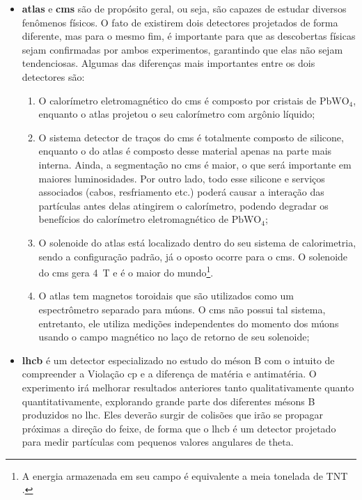 \begin{itemize}
\item \textbf{\gls{atlas}} e \textbf{\gls{cms}} são de propósito geral, ou seja, são capazes de estudar 
diversos fenômenos físicos. O fato de existirem dois detectores projetados de forma
diferente, mas para o mesmo fim, é importante para que as descobertas físicas
sejam confirmadas por ambos experimentos, garantindo que elas não sejam
tendenciosas. Algumas das diferenças mais importantes entre os dois detectores são:
\begin{enumerate}
\item O calorímetro eletromagnético do \gls{cms} é composto por cristais de
$\text{PbWO}_4$, enquanto o
\gls{atlas} projetou o seu calorímetro com argônio líquido;
\item O sistema detector de traços do \gls{cms} é totalmente composto de
silicone, enquanto o do \gls{atlas} é composto desse material apenas na parte mais
interna. Ainda, a segmentação no \gls{cms} é maior, o que será importante em
maiores luminosidades.
Por outro lado, todo esse silicone e serviços associados (cabos, resfriamento
etc.) poderá causar a interação das partículas antes delas atingirem o calorímetro,
podendo degradar os benefícios do calorímetro eletromagnético de $\text{PbWO}_4$;
\item O solenoide do \gls{atlas} está localizado dentro do seu sistema de
calorimetria, sendo a configuração padrão, já o oposto ocorre para o \gls{cms}.
O solenoide do \gls{cms} gera 4~T e é o maior do mundo\footnote{A energia
armazenada em seu campo é equivalente a meia tonelada de TNT \cite{closerLook}.}.
\item O \gls{atlas} tem magnetos toroidais que são utilizados como um
espectrômetro separado para múons. O \gls{cms} não possui tal
sistema, entretanto, ele utiliza medições independentes do momento dos múons
usando o campo magnético no laço de retorno de seu solenoide;
\end{enumerate}
\item \textbf{\gls{lhcb}} é um detector especializado no estudo do méson B com o
intuito de compreender a Violação \gls{cp} e a diferença de matéria e
antimatéria. O experimento irá melhorar resultados anteriores tanto
qualitativamente quanto quantitativamente, explorando grande parte dos
diferentes mésons B produzidos no \gls{lhc}. Eles deverão surgir de colisões que
irão se propagar próximas a direção do feixe, de forma que o \gls{lhcb} 
é um detector projetado para medir partículas com pequenos valores angulares
de \gls{theta}.

\end{itemize}
